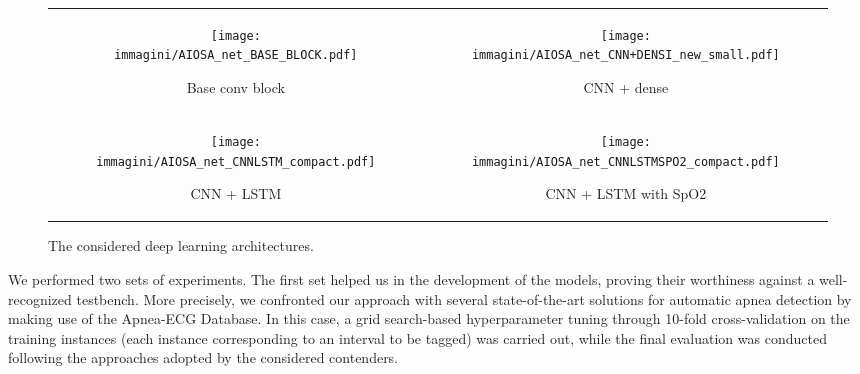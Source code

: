 \documentclass[5p,twocolumn,lefttitle]{elsarticle}
\begin{document}
\begin{figure}[htb]
\centering
\begin{tabular}[t]{cc}
    \begin{subfigure}{0.5\linewidth}
        \centering
        \texttt{[image: immagini/AIOSA\_net\_BASE\_BLOCK.pdf]}
        \caption{Base conv block\vspace{1em}}\label{fig:base_block} 
    \end{subfigure}
&
    \begin{subfigure}{0.25\linewidth}
        \centering
        \texttt{[image: immagini/AIOSA\_net\_CNN+DENSI\_new\_small.pdf]}
        \caption{CNN + dense\vspace{1em}}\label{fig:cnn_dense} 
    \end{subfigure}
    \\ 
        \begin{subfigure}[t]{0.4\linewidth}
            \centering
            \texttt{[image: immagini/AIOSA\_net\_CNNLSTM\_compact.pdf]}
            \caption{CNN + LSTM\vspace{-1.5em}}\label{fig:cnn_lstm}
        \end{subfigure}\vspace{2em} &
        \begin{subfigure}[t]{0.42\linewidth}
            \centering
            \texttt{[image: immagini/AIOSA\_net\_CNNLSTMSPO2\_compact.pdf]}
            \caption{CNN + LSTM with SpO2\vspace{-1.5em}}\label{fig:cnn_lstm_sp}
        \end{subfigure}
\end{tabular}
    \caption{The considered deep learning architectures.}\label{fig:dnn_architectures}
\end{figure}



We performed two sets of experiments. The first set helped us in the development of the models, proving their worthiness against a well-recognized testbench. More precisely, we confronted our approach with several state-of-the-art solutions for automatic apnea detection by making use of the Apnea-ECG Database. In this case, a grid search-based hyperparameter tuning through 10-fold cross-validation on the training instances (each instance corresponding to an interval to be tagged) was carried out, while the final evaluation was conducted following the approaches adopted by the considered contenders.
\end{document}
